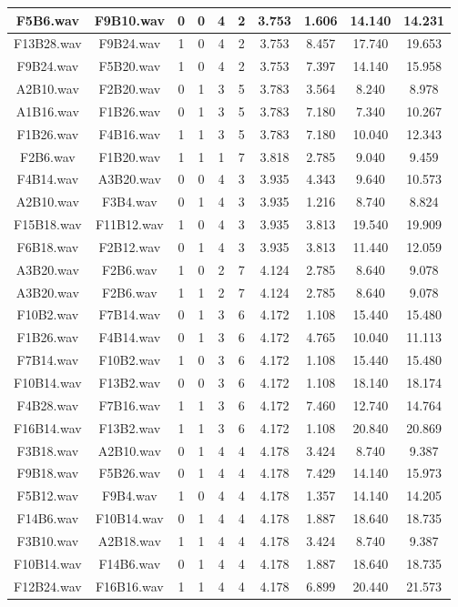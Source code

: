 \documentclass[11pt,a4paper,twoside]{book}
\begin{document}
\begin{longtable}[c]{|c|c|c|c|c|c|c|c|c|c|}
F5B6.wav&F9B10.wav&0&0&4&2&3.753&1.606&14.140&14.231\\ \hline
F13B28.wav&F9B24.wav&1&0&4&2&3.753&8.457&17.740&19.653\\ \hline
F9B24.wav&F5B20.wav&1&0&4&2&3.753&7.397&14.140&15.958\\ \hline
A2B10.wav&F2B20.wav&0&1&3&5&3.783&3.564&8.240&8.978\\ \hline
A1B16.wav&F1B26.wav&0&1&3&5&3.783&7.180&7.340&10.267\\ \hline
F1B26.wav&F4B16.wav&1&1&3&5&3.783&7.180&10.040&12.343\\ \hline
F2B6.wav&F1B20.wav&1&1&1&7&3.818&2.785&9.040&9.459\\ \hline
F4B14.wav&A3B20.wav&0&0&4&3&3.935&4.343&9.640&10.573\\ \hline
A2B10.wav&F3B4.wav&0&1&4&3&3.935&1.216&8.740&8.824\\ \hline
F15B18.wav&F11B12.wav&1&0&4&3&3.935&3.813&19.540&19.909\\ \hline
F6B18.wav&F2B12.wav&0&1&4&3&3.935&3.813&11.440&12.059\\ \hline
A3B20.wav&F2B6.wav&1&0&2&7&4.124&2.785&8.640&9.078\\ \hline
A3B20.wav&F2B6.wav&1&1&2&7&4.124&2.785&8.640&9.078\\ \hline
F10B2.wav&F7B14.wav&0&1&3&6&4.172&1.108&15.440&15.480\\ \hline
F1B26.wav&F4B14.wav&0&1&3&6&4.172&4.765&10.040&11.113\\ \hline
F7B14.wav&F10B2.wav&1&0&3&6&4.172&1.108&15.440&15.480\\ \hline
F10B14.wav&F13B2.wav&0&0&3&6&4.172&1.108&18.140&18.174\\ \hline
F4B28.wav&F7B16.wav&1&1&3&6&4.172&7.460&12.740&14.764\\ \hline
F16B14.wav&F13B2.wav&1&1&3&6&4.172&1.108&20.840&20.869\\ \hline
F3B18.wav&A2B10.wav&0&1&4&4&4.178&3.424&8.740&9.387\\ \hline
F9B18.wav&F5B26.wav&0&1&4&4&4.178&7.429&14.140&15.973\\ \hline
F5B12.wav&F9B4.wav&1&0&4&4&4.178&1.357&14.140&14.205\\ \hline
F14B6.wav&F10B14.wav&0&1&4&4&4.178&1.887&18.640&18.735\\ \hline
F3B10.wav&A2B18.wav&1&1&4&4&4.178&3.424&8.740&9.387\\ \hline
F10B14.wav&F14B6.wav&0&1&4&4&4.178&1.887&18.640&18.735\\ \hline
F12B24.wav&F16B16.wav&1&1&4&4&4.178&6.899&20.440&21.573\\ \hline

\end{longtable}
\end{document}
